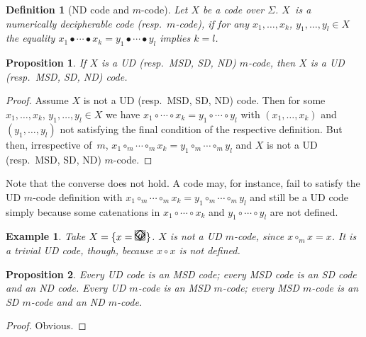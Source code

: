\documentclass[final,nomarks]{dmtcs-episciences}
\newcommand{\dfimglabel}[3]{
    \put(#1,#2){
        \put(0,0){\line(1,0){10}}
        \put(0,0){\line(0,1){10}}
        \put(10,10){\line(-1,0){10}}
        \put(10,10){\line(0,-1){10}}
        \put(3,2){$#3$}
    }
}
\newcommand{\dfimgbegin}[2]{
    \put(#1,#2){
        \put(5,5){\circle{10}}
    }
}
\newcommand{\dfimgend}[2]{
    \put(#1,#2){
        \put(0,0){{\huge $\diamond$}}
    }
}
\newcommand{\dfimgbeginendlabel}[3]{
    \dfimglabel{#1}{#2}{#3}
    \dfimgbegin{#1}{#2}
    \dfimgend{#1}{#2}
}
\newtheorem{definition}{Definition}
\newtheorem{example}{Example}
\newtheorem{proposition}{Proposition}
\begin{document}
\begin{definition}[ND code and $m$-code]
Let $X$ be a code over $\Sigma$. $X$~is a \emph{numerically
decipherable code} (resp.\ \emph{$m$-code}), if for any
$x_1,\ldots,x_k$, $y_1,\ldots,y_l\in X$ the equality
$x_1\bullet\cdots\bullet x_k=y_1\bullet\cdots\bullet y_l$
implies $k=l$.
\end{definition}



\begin{proposition}\label{prop:incl1}
If $X$ is a UD (resp.\ MSD, SD, ND) $m$-code, 
then $X$ is a UD (resp.\ MSD, SD, ND) code.
\end{proposition}

\begin{proof}
Assume $X$ is not a UD (resp.\ MSD, SD, ND) code. Then for some
$x_1,\ldots,x_k$, $y_1,\ldots,y_l\in X$ we have
$x_1\circ\cdots\circ x_k=y_1\circ\cdots\circ y_l$ with
$(x_1,\ldots,x_k)$ and $(y_1,\ldots,y_l)$ not satisfying the
final condition of the respective definition. But then,
irrespective of~$m$,
$x_1\circ_m\cdots\circ_m x_k=y_1\circ_m\cdots\circ_m y_l$
and $X$ is not a UD (resp.\ MSD, SD, ND) $m$-code.
\end{proof}

Note that the converse does not hold. A code may, for instance, fail to satisfy the 
UD $m$-code definition with 
$x_1\circ_m\cdots\circ_m x_k=y_1\circ_m\cdots\circ_m y_l$ 
and still be a UD code simply because some catenations in 
$x_1\circ\cdots\circ x_k$ and $y_1\circ\cdots\circ y_l$ are not defined.


\begin{example}
Take $X=\{x=
\begin{picture}(11,5)
    \dfimgbeginendlabel{00}{00}{a}
\end{picture}
\}$. $X$ is not a UD $m$-code, since $x\circ_m x=x$. It is a trivial UD code, though, because $x\circ x$ is not defined.
\end{example}


\begin{proposition}\label{prop:incl2}
Every UD code is an MSD code; every MSD code is an SD code and
an ND code. Every UD $m$-code is an MSD $m$-code; every MSD
$m$-code is an SD $m$-code and an ND $m$-code.
\end{proposition}

\begin{proof}
Obvious. 
\end{proof}
\end{document}
